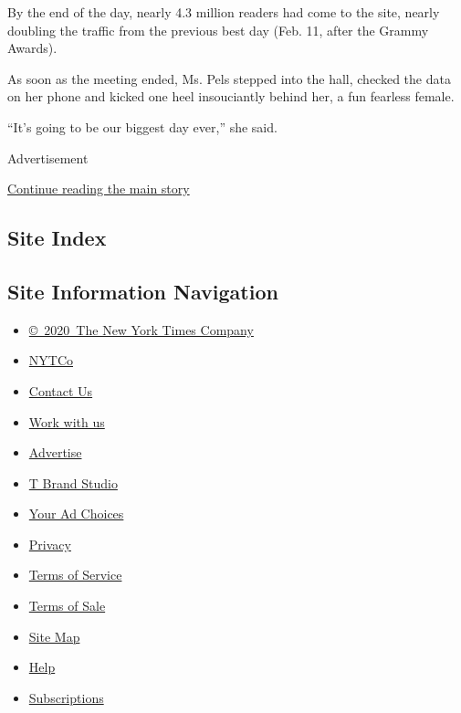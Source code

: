By the end of the day, nearly 4.3 million readers had come to the site,
nearly doubling the traffic from the previous best day (Feb. 11, after
the Grammy Awards).

As soon as the meeting ended, Ms. Pels stepped into the hall, checked
the data on her phone and kicked one heel insouciantly behind her, a fun
fearless female.

``It's going to be our biggest day ever,'' she said.

Advertisement

\protect\hyperlink{after-bottom}{Continue reading the main story}

\hypertarget{site-index}{%
\subsection{Site Index}\label{site-index}}

\hypertarget{site-information-navigation}{%
\subsection{Site Information
Navigation}\label{site-information-navigation}}

\begin{itemize}
\tightlist
\item
  \href{https://help.nytimes3xbfgragh.onion/hc/en-us/articles/115014792127-Copyright-notice}{©~2020~The
  New York Times Company}
\end{itemize}

\begin{itemize}
\tightlist
\item
  \href{https://www.nytco.com/}{NYTCo}
\item
  \href{https://help.nytimes3xbfgragh.onion/hc/en-us/articles/115015385887-Contact-Us}{Contact
  Us}
\item
  \href{https://www.nytco.com/careers/}{Work with us}
\item
  \href{https://nytmediakit.com/}{Advertise}
\item
  \href{http://www.tbrandstudio.com/}{T Brand Studio}
\item
  \href{https://www.nytimes3xbfgragh.onion/privacy/cookie-policy\#how-do-i-manage-trackers}{Your
  Ad Choices}
\item
  \href{https://www.nytimes3xbfgragh.onion/privacy}{Privacy}
\item
  \href{https://help.nytimes3xbfgragh.onion/hc/en-us/articles/115014893428-Terms-of-service}{Terms
  of Service}
\item
  \href{https://help.nytimes3xbfgragh.onion/hc/en-us/articles/115014893968-Terms-of-sale}{Terms
  of Sale}
\item
  \href{https://spiderbites.nytimes3xbfgragh.onion}{Site Map}
\item
  \href{https://help.nytimes3xbfgragh.onion/hc/en-us}{Help}
\item
  \href{https://www.nytimes3xbfgragh.onion/subscription?campaignId=37WXW}{Subscriptions}
\end{itemize}
